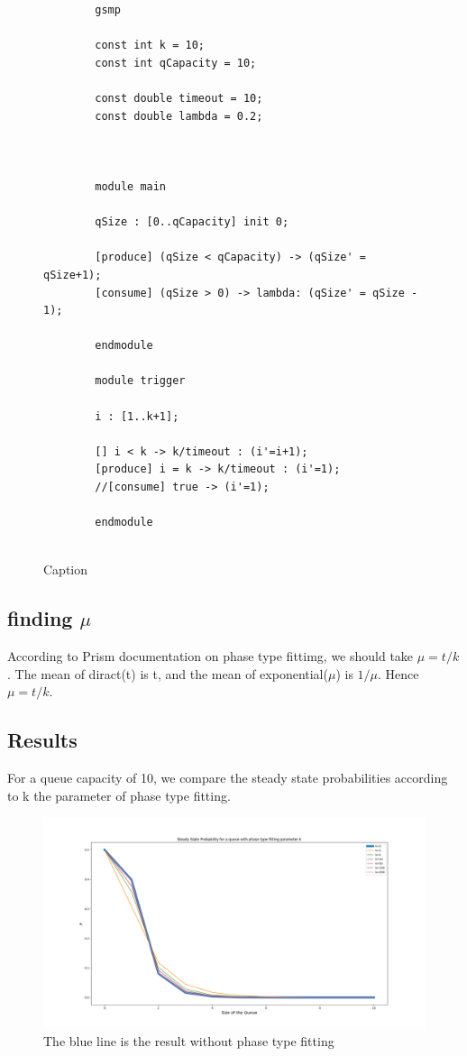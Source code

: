 \documentclass[paper=a4, fontsize=11pt]{scrartcl}
\numberwithin{equation}{section}		%
\numberwithin{figure}{section}			%
\numberwithin{table}{section}				%
\begin{document}
	
	
	\begin{figure}
		\centering
		\begin{lstlisting}
		gsmp
		
		const int k = 10;
		const int qCapacity = 10;
		
		const double timeout = 10;
		const double lambda = 0.2;
		
		
		
		module main
		
		qSize : [0..qCapacity] init 0;
		
		[produce] (qSize < qCapacity) -> (qSize' = qSize+1);
		[consume] (qSize > 0) -> lambda: (qSize' = qSize - 1);
		
		endmodule
		
		module trigger
		
		i : [1..k+1];
		
		[] i < k -> k/timeout : (i'=i+1);
		[produce] i = k -> k/timeout : (i'=1);
		//[consume] true -> (i'=1);
		
		endmodule
		
		\end{lstlisting}
		\caption{Caption}
		\label{fig:queuecode2}
	\end{figure}
	
	
	
	
	\subsection{finding $\mu$}
	
	According to Prism documentation on phase type fittimg, we should take $\mu = t/k$. The mean of diract(t) is t, and the mean of exponential($\mu$) is $1/\mu$. Hence $\mu = t/k$.
	
	
	
	\subsection{Results}
	
	For a queue capacity of 10, we compare the steady state probabilities according to k the parameter of phase type fitting.
	
	\begin{figure}
		\centering
		\includegraphics[width=18cm]{sspqueue.png}
		\caption{The blue line is the result without phase type fitting}
		\label{fig:res1}
	\end{figure}
	
\end{document}
